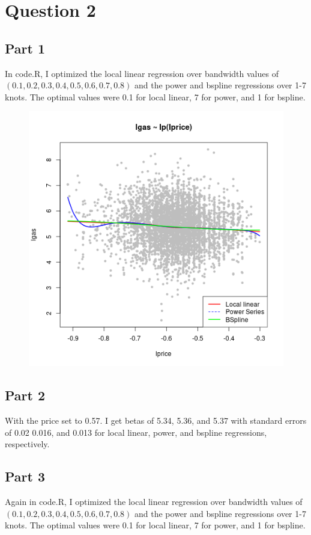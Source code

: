 \documentclass{article}
\begin{document}
\section{Question 2}

\subsection{Part 1}
In code.R, I optimized the local linear regression over bandwidth values of $(0.1,0.2,0.3,0.4,0.5,0.6,0.7,0.8)$ and the power and bspline regressions over 1-7 knots. The optimal values were 0.1 for local linear, 7 for power, and 1 for bspline.
\begin{figure}
	\centering
	\includegraphics{Q2_1.png}
\end{figure}
\subsection{Part 2}
With the price set to 0.57. I get betas of 5.34, 5.36, and 5.37 with standard errors of 0.02 0.016, and 0.013 for local linear, power, and bspline regressions, respectively.
\subsection{Part 3}
Again in code.R, I optimized the local linear regression over bandwidth values of $(0.1,0.2,0.3,0.4,0.5,0.6,0.7,0.8)$ and the power and bspline regressions over 1-7 knots. The optimal values were 0.1 for local linear, 7 for power, and 1 for bspline.
\end{document}
